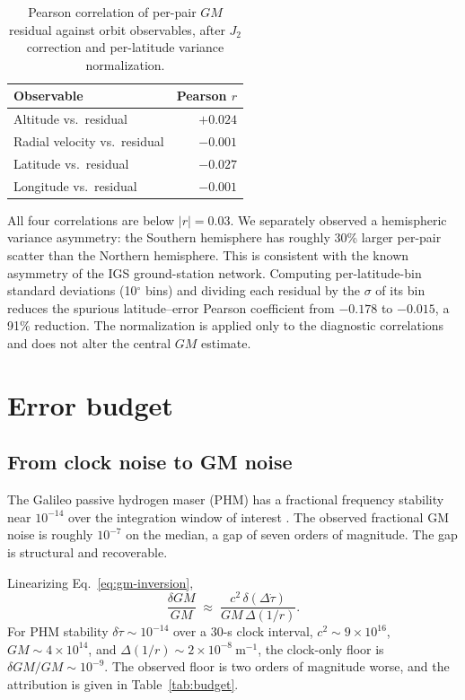 \documentclass[11pt,a4paper]{article}
\begin{document}
\begin{table}[h]
    \centering
    \caption{Pearson correlation of per-pair $GM$ residual against orbit observables, after $J_2$ correction and per-latitude variance normalization.}
    \label{tab:correlations}
    \begin{tabular}{lr}
        \toprule
        Observable & Pearson $r$ \\
        \midrule
        Altitude vs.\ residual & $+0.024$ \\
        Radial velocity vs.\ residual & $-0.001$ \\
        Latitude vs.\ residual & $-0.027$ \\
        Longitude vs.\ residual & $-0.001$ \\
        \bottomrule
    \end{tabular}
\end{table}

All four correlations are below $|r| = 0.03$. We separately observed a hemispheric variance asymmetry: the Southern hemisphere has roughly 30\% larger per-pair scatter than the Northern hemisphere. This is consistent with the known asymmetry of the IGS ground-station network. Computing per-latitude-bin standard deviations (10$^\circ$ bins) and dividing each residual by the $\sigma$ of its bin reduces the spurious latitude--error Pearson coefficient from $-0.178$ to $-0.015$, a 91\% reduction. The normalization is applied only to the diagnostic correlations and does not alter the central $GM$ estimate.

\section{Error budget}

\subsection{From clock noise to GM noise}

The Galileo passive hydrogen maser (PHM) has a fractional frequency stability near $10^{-14}$ over the integration window of interest \citep{Droz2009}. The observed fractional GM noise is roughly $10^{-7}$ on the median, a gap of seven orders of magnitude. The gap is structural and recoverable.

Linearizing Eq.~\eqref{eq:gm-inversion},
\begin{equation}
    \frac{\delta GM}{GM} \;\approx\; \frac{c^2\,\delta(\Delta\dot\tau)}{GM\,\Delta(1/r)}.
\end{equation}
For PHM stability $\delta\dot\tau \sim 10^{-14}$ over a 30-s clock interval, $c^2 \sim 9 \times 10^{16}$, $GM \sim 4 \times 10^{14}$, and $\Delta(1/r) \sim 2 \times 10^{-8}~\mathrm{m^{-1}}$, the clock-only floor is $\delta GM/GM \sim 10^{-9}$. The observed floor is two orders of magnitude worse, and the attribution is given in Table~\ref{tab:budget}.
\end{document}
